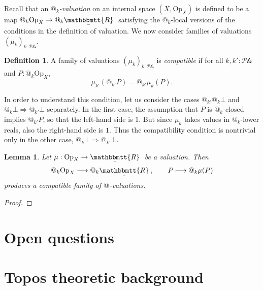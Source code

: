 \documentclass[11pt, oneside, article]{memoir}
\makeatletter
\theoremstyle{plain}
\newtheorem{lemma}[theorem]{Lemma}
\theoremstyle{definition}
\newtheorem{definition}[theorem]{Definition}
\theoremstyle{remark}
\newtheorem{example}[theorem]{Example}
\renewcommand{\ss}{\subseteq}
\newcommand{\Set}[1]{\mathrm{#1}}
\newcommand{\wh}[1]{\widehat{#1}}
\newcommand{\ubar}[1]{\underaccent{\bar}{#1}}
\newcommand{\internal}[1]{\raisebox{-.03ex}{$\mathbbmtt{#1}$}}
\newcommand{\hs}{\hspace{1.1pt}}
\newcommand{\trr}{\internal{R}\hs}
\newcommand{\tlrr}{\ubar{\trr}\hs}
\newcommand{\Op}{\Set{Op}}
\newcommand{\cpct}[1]{\Set{Cpct}_{#1}}
\newcommand{\pt}{k}				%
\newcommand{\Pts}{\mathcal{Pts}}		%
\newcommand{\bas}[1]{\wh{#1}}
\newcommand{\AtSymbol}{{@}}
\newcommand{\At}[1][\pt]{\AtSymbol_{#1}}
\newcommand{\imp}{\Rightarrow}
\makeatother
\begin{document}
Recall that an \emph{$\At$-valuation} on an internal space $(X,\Op_X)$ is defined to be a map $\At \Op_X \to \At \tlrr$ satisfying the $\At$-local versions of the conditions in the definition of valuation. We now consider families of valuations $(\mu_\pt)_{\pt : \Pts}$.

\begin{definition}
	A family of valuations $(\mu_\pt)_{\pt : \Pts}$ is \emph{compatible} if for all $\pt, \pt' : \Pts$ and $P : \At \Op_X$,
	\[
		\mu_{\pt'}(\At[\pt'] P) = \At[\pt'] \mu_\pt(P).
	\]
\end{definition}

In order to understand this condition, let us consider the cases $\At[\pt'] \At \bot$ and $\At \bot \imp \At[\pt'] \bot$ separately. In the first case, the assumption that $P$ is $\At$-closed implies $\At[\pt'] P$, so that the left-hand side is $1$. But since $\mu_\pt$ takes values in $\At$-lower reals, also the right-hand side is $1$. Thus the compatibility condition is nontrivial only in the other case, $\At \bot \imp \At[\pt'] \bot$.

\begin{lemma}
	Let $\mu : \Op_X \to \tlrr$ be a valuation. Then
	\[
		\At \Op_X \longrightarrow \At \tlrr, \qquad P \longmapsto \At \mu(P)
	\]
	produces a compatible family of $\At[]$-valuations.
\end{lemma}

\begin{proof}
	
\end{proof}

\chapter{Open questions}


\appendix

\chapter{Topos theoretic background}\label{sec.topos_background}
%
%
%
%
\end{document}
